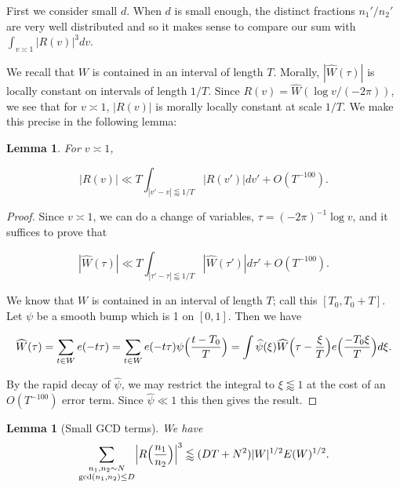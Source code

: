 \documentclass{amsart}
\theoremstyle{plain}
\newtheorem{lmm}[thrm]{Lemma}
\numberwithin{equation}{section}
\begin{document}
First we consider small $d$.   When $d$ is small enough, the distinct fractions $n_1'/n_2'$ are very well distributed and so it makes sense to compare our sum with $\int_{v\asymp 1} |R(v)|^3 dv$.  

We recall that $W$ is contained in an interval of length $T$.   Morally,  $|\widehat{W}(\tau)|$ is locally constant on intervals of length $1/T$.  Since $R(v) = \widehat{W}(\log v/(-2\pi))$,  we see that for $v \asymp 1$,  $|R(v)|$ is morally locally constant at scale $1/T$.  We make this precise in the following lemma:

%
%

\begin{lmm}\label{lmm:RStationary} For $v \asymp 1$,

\[ |R(v)| \ll T \int_{|v' - v| \lessapprox 1/T} |R(v')| dv' + O(T^{-100}). \]

\end{lmm}

\begin{proof} Since $v \asymp 1$,  we can do a change of variables,  $\tau =(- 2\pi)^{-1} \log v$,  and it suffices to prove that

\[ |\widehat{W}(\tau)| \ll T \int_{|\tau' - \tau| \lessapprox 1/T} |\widehat{W}(\tau')| d \tau' + O(T^{-100}). \]

We know that $W$ is contained in an interval of length $T$; call this $[T_0,T_0+T]$. Let $\psi$ be a smooth bump which is 1 on $[0,1]$. Then we have

\begin{align*}
\widehat{W}(\tau)=\sum_{t\in W}e(-t\tau)=\sum_{t\in W}e(-t\tau)\psi\Bigl(\frac{t-T_0}{T}\Bigr)=\int \widehat{\psi}(\xi)\widehat{W}\Bigl(\tau-\frac{\xi}{T}\Bigr)e\Bigl(\frac{-T_0\xi}{T}\Bigr)d\xi.
\end{align*}

By the rapid decay of $\widehat{\psi}$, we may restrict the integral to $\xi\lessapprox 1$ at the cost of an $O(T^{-100})$ error term. Since $\widehat{\psi}\ll 1$ this then gives the result.
\end{proof}

%
%


\begin{lmm}[Small GCD terms]\label{lmm:DSmall} We have
\[
\sum_{\substack{n_1,n_2\sim N\\ \gcd(n_1,n_2)\le D}}\Bigl|R\Bigl(\frac{n_1}{n_2}\Bigr)\Bigr|^3\lessapprox ( D T + N^2 ) |W|^{1/2} E(W)^{1/2}.
\]
\end{lmm}
\end{document}
